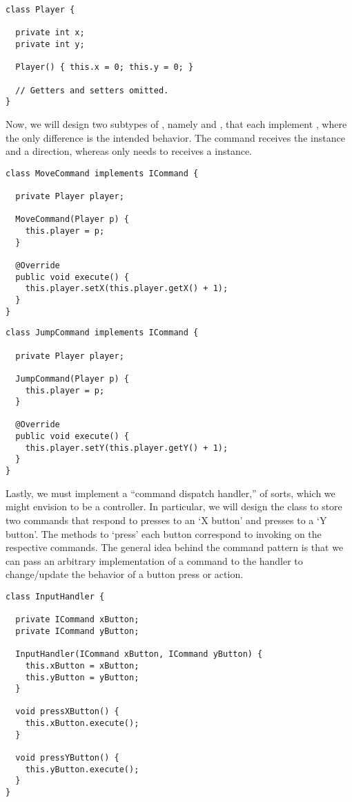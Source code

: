 \begin{lstlisting}[language=MyJava]
class Player {
  
  private int x;
  private int y;

  Player() { this.x = 0; this.y = 0; }

  // Getters and setters omitted.
}
\end{lstlisting}

Now, we will design two subtypes of , namely  and , that each implement , where the only difference is the intended behavior. 
The  command receives the  instance and a direction, whereas  only needs to receives a  instance. 

\enlargethispage{-2\baselineskip}
\begin{lstlisting}[language=MyJava]
class MoveCommand implements ICommand {

  private Player player;

  MoveCommand(Player p) { 
    this.player = p; 
  }

  @Override
  public void execute() { 
    this.player.setX(this.player.getX() + 1); 
  }
}
\end{lstlisting}

\begin{lstlisting}[language=MyJava]
class JumpCommand implements ICommand {
  
  private Player player;

  JumpCommand(Player p) { 
    this.player = p; 
  }

  @Override
  public void execute() { 
    this.player.setY(this.player.getY() + 1); 
  }
}
\end{lstlisting}

Lastly, we must implement a ``command dispatch handler,'' of sorts, which we might envision to be a controller. 
In particular, we will design the  class to store two commands that respond to presses to an `X button' and presses to a `Y button'. 
The methods to `press' each button correspond to invoking  on the respective commands. 
The general idea behind the command pattern is that we can pass an arbitrary implementation of a command to the handler to change/update the behavior of a button press or action. 

\begin{lstlisting}[language=MyJava]
class InputHandler {

  private ICommand xButton;
  private ICommand yButton;

  InputHandler(ICommand xButton, ICommand yButton) {
    this.xButton = xButton;
    this.yButton = yButton;
  }

  void pressXButton() { 
    this.xButton.execute(); 
  }

  void pressYButton() { 
    this.yButton.execute(); 
  }
}
\end{lstlisting}

